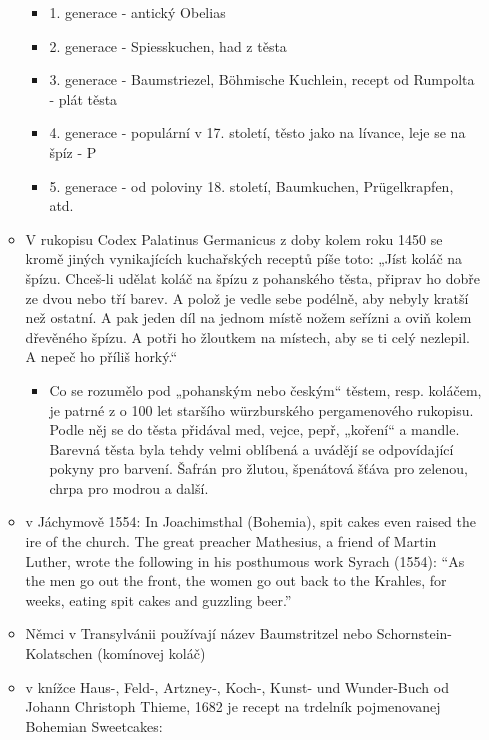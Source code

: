 \begin{itemize}
\begin{itemize}
    \begin{itemize}
    \tightlist
    \item
      1. generace - antický Obelias
    \item
      2. generace - Spiesskuchen, had z těsta
    \item
      3. generace - Baumstriezel, Böhmische Kuchlein, recept od Rumpolta
      - plát těsta
    \item
      4. generace - populární v 17. století, těsto jako na lívance, leje
      se na špíz - P
    \item
      5. generace - od poloviny 18. století, Baumkuchen, Prügelkrapfen,
      atd.
    \end{itemize}
  \item
    V rukopisu Codex Palatinus Germanicus z doby kolem roku 1450 se
    kromě jiných vynikajících kuchařských receptů píše toto: „Jíst koláč
    na špízu. Chceš-li udělat koláč na špízu z pohanského těsta, připrav
    ho dobře ze dvou nebo tří barev. A polož je vedle sebe podélně, aby
    nebyly kratší než ostatní. A pak jeden díl na jednom místě nožem
    seřízni a oviň kolem dřevěného špízu. A potři ho žloutkem na
    místech, aby se ti celý nezlepil. A nepeč ho příliš horký.``

    \begin{itemize}
    \tightlist
    \item
      Co se rozumělo pod „pohanským nebo českým`` těstem, resp. koláčem,
      je patrné z o 100 let staršího würzburského pergamenového
      rukopisu. Podle něj se do těsta přidával med, vejce, pepř,
      „koření`` a mandle. Barevná těsta byla tehdy velmi oblíbená a
      uvádějí se odpovídající pokyny pro barvení. Šafrán pro žlutou,
      špenátová šťáva pro zelenou, chrpa pro modrou a další.
    \end{itemize}
  \item
    v Jáchymově 1554: In Joachimsthal (Bohemia), spit cakes even raised
    the ire of the church. The great preacher Mathesius, a friend of
    Martin Luther, wrote the following in his posthumous work Syrach
    (1554): ``As the men go out the front, the women go out back to the
    Krahles, for weeks, eating spit cakes and guzzling beer.''
  \item
    Němci v Transylvánii používají název Baumstritzel nebo
    Schornstein-Kolatschen (komínovej koláč)
  \item
    v knížce Haus-, Feld-, Artzney-, Koch-, Kunst- und Wunder-Buch od
    Johann Christoph Thieme, 1682 je recept na trdelník pojmenovanej
    Bohemian Sweetcakes:


\end{itemize}
\end{itemize}
